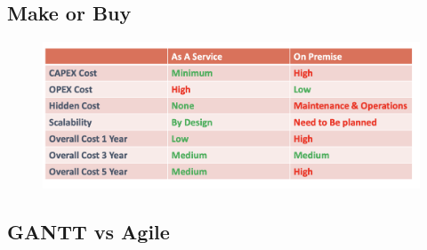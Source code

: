 \documentclass{article}
\begin{document}
\subsection{Make or Buy}

\begin{figure}[htp]
    \centering
    \includegraphics[width=\linewidth]{fig/make_or_buy.png}
    \label{fig:Make Or Buy}
\end{figure}

\subsection{GANTT vs Agile}
\end{document}
